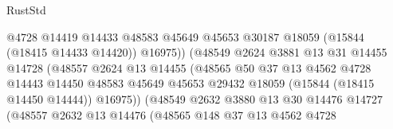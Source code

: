 \begin{lexlean}{RustStd}
\begin{coremodule}
                                          @4728
                                          @14419
                                          @14433
                                          @48583
                                          @45649
                                          @45653
                                          @30187
                                          @18059
                                          (@15844 (@18415 @14433 @14420))
                                          @16975))
                                      (@48549
                                        @2624
                                        @3881
                                        @13
                                        @31
                                        @14455
                                        @14728
                                        (@48557
                                          @2624
                                          @13
                                          @14455
                                          (@48565
                                            @50
                                            @37
                                            @13
                                            @4562
                                            @4728
                                            @14443
                                            @14450
                                            @48583
                                            @45649
                                            @45653
                                            @29432
                                            @18059
                                            (@15844 (@18415 @14450 @14444))
                                            @16975))
                                        (@48549
                                          @2632
                                          @3880
                                          @13
                                          @30
                                          @14476
                                          @14727
                                          (@48557
                                            @2632
                                            @13
                                            @14476
                                            (@48565
                                              @148
                                              @37
                                              @13
                                              @4562
                                              @4728

\end{coremodule}
\end{lexlean}
